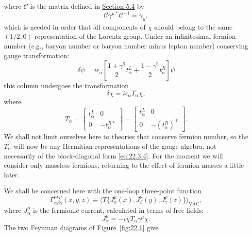 where $\mathcal C$ is the matrix defined in \hyperref[sec:5.4]{Section 5.4}
by
\[
 \mathcal C\gamma^{\mu *}\mathcal C^{-1}=\gamma_\mu,
\]
which is needed in order that all components of $\chi$ should belong to the
same $(1/2,0)$ representation of the Lorentz group. Under an infinitesimal
fermion number (e.g., baryon number or baryon number minus lepton number)
conserving gauge transformation:
\begin{equation}
 \delta\psi=i\epsilon_\alpha
 \left[
  \frac{1+\gamma^5}{2}t_\alpha^L
  +\frac{1-\gamma^5}{2}t_\alpha^R
 \right]\psi
 \tag{22.3.2}\label{eq:22.3.2}
\end{equation}
this column undergoes the transformation
\begin{equation}
 \delta\chi=i\epsilon_\alpha T_\alpha\chi,
 \tag{22.3.3}\label{eq:22.3.3}
\end{equation}
where
\begin{equation}
 T_\alpha=
 \begin{bmatrix}
  t_\alpha^L&0\\
  0&-t_\alpha^{R*}
 \end{bmatrix}
 =
 \begin{bmatrix}
  t_\alpha^L&0\\
  0&-(t_\alpha^R)^{\mathrm T}
 \end{bmatrix}.
 \tag{22.3.4}\label{eq:22.3.4}
\end{equation}
We shall not limit ourselves here to theories that conserve fermion number,
so the $T_\alpha$ will now be any Hermitian representations of the gauge
algebra, not necessarily of the block-diagonal form \eqref{eq:22.3.4}. For
the moment we will consider only massless fermions, returning to the effect
of fermion masses a little later.

We shall be concerned here with the one-loop three-point function
\begin{equation}
 \Gamma_{\alpha\beta\gamma}^{\mu\nu\rho}(x,y,z)
 \equiv
 \bigl\langle
  T\{J_\alpha^\mu(x),J_\beta^\nu(y),J_\gamma^\rho(z)\}
 \bigr\rangle_{\mathrm{VAC}},
 \tag{22.3.5}\label{eq:22.3.5}
\end{equation}
where $J_\alpha^\mu$ is the fermionic current, calculated in terms of free
fields:
\begin{equation}
 J_\alpha^\mu=-i\bar\chi T_\alpha\gamma^\mu\chi.
 \tag{22.3.6}\label{eq:22.3.6}
\end{equation}
The two Feynman diagrams of Figure~\ref{fig:22.1} give



